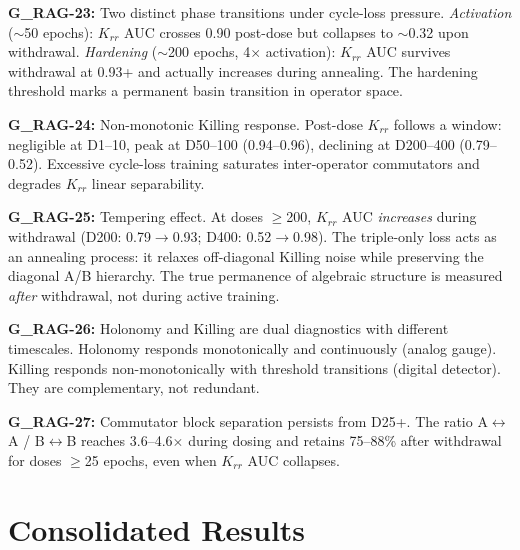 \documentclass[11pt,letterpaper]{article}
\begin{document}
\textbf{G\_RAG-23:} Two distinct phase transitions under cycle-loss pressure. \textit{Activation} ($\sim$50 epochs): $K_{rr}$ AUC crosses 0.90 post-dose but collapses to $\sim$0.32 upon withdrawal. \textit{Hardening} ($\sim$200 epochs, 4$\times$ activation): $K_{rr}$ AUC survives withdrawal at 0.93+ and actually increases during annealing. The hardening threshold marks a permanent basin transition in operator space.

\textbf{G\_RAG-24:} Non-monotonic Killing response. Post-dose $K_{rr}$ follows a window: negligible at D1--10, peak at D50--100 (0.94--0.96), declining at D200--400 (0.79--0.52). Excessive cycle-loss training saturates inter-operator commutators and degrades $K_{rr}$ linear separability.

\textbf{G\_RAG-25:} Tempering effect. At doses $\ge$200, $K_{rr}$ AUC \textit{increases} during withdrawal (D200: 0.79$\to$0.93; D400: 0.52$\to$0.98). The triple-only loss acts as an annealing process: it relaxes off-diagonal Killing noise while preserving the diagonal A/B hierarchy. The true permanence of algebraic structure is measured \textit{after} withdrawal, not during active training.

\textbf{G\_RAG-26:} Holonomy and Killing are dual diagnostics with different timescales. Holonomy responds monotonically and continuously (analog gauge). Killing responds non-monotonically with threshold transitions (digital detector). They are complementary, not redundant.

\textbf{G\_RAG-27:} Commutator block separation persists from D25+. The ratio A$\leftrightarrow$A / B$\leftrightarrow$B reaches 3.6--4.6$\times$ during dosing and retains 75--88\% after withdrawal for doses $\ge$25 epochs, even when $K_{rr}$ AUC collapses.

\section{Consolidated Results}
\end{document}
